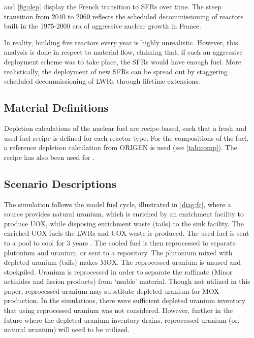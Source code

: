  and \cref{fig:dep} display
the French transition to \glspl{SFR} over time.
The steep transition from 2040 to 2060 reflects the scheduled
decommissioning of reactors built in the 1975-2000
era of aggressive nuclear growth in France.

In reality, building five reactors every year is highly unrealistic. However,
this analysis is done in respect to material flow, claiming that, if such an aggressive
deployment scheme was to take place, the \glspl{SFR} would have enough fuel.
More realistically, the deployment of new \glspl{SFR} can be spread out by
staggering scheduled decommissioning of \glspl{LWR} through lifetime extensions.

\subsection{Material Definitions}
Depletion calculations of the nuclear fuel are recipe-based, such that a fresh 
and used fuel recipe is defined for each reactor type.
For the compositions of the fuel, a reference depletion calculation
from ORIGEN is used (see \cref{tab:comp}). The recipe has also been used for
\cite{wilson_adoption_2009}.


\subsection{Scenario Descriptions}
The simulation follows the model fuel cycle, illustrated in \cref{diag:fc},
where a source provides natural uranium, which is enriched by an enrichment
facility to produce \gls{UOX}, while disposing enrichment waste (tails)
to the sink facility. The enriched \gls{UOX} fuels
the \gls{LWR}s and \gls{UOX} waste is produced. The used fuel
is sent to a pool to cool for 3 years \cite{carre_overview_2009}.
The cooled fuel is then reprocessed to separate plutonium and uranium,
or sent to a repository.
The plutonium mixed with depleted uranium (tails) makes \gls{MOX}.
The reprocessed uranium is unused and stockpiled. Uranium is reprocessed
in order to separate the raffinate (Minor actinides and fission products)
from `usable' material. Though not utilized in this paper, reprocessed
uranium may substitute depleted uranium for \gls{MOX} production. In the
simulations, there were sufficient depleted uranium inventory that using reprocessed
uranium was not considered. However, further in the future where the depleted
uranium inventory drains, reprocessed uranium (or, natural uranium) will need to be utilized. 


